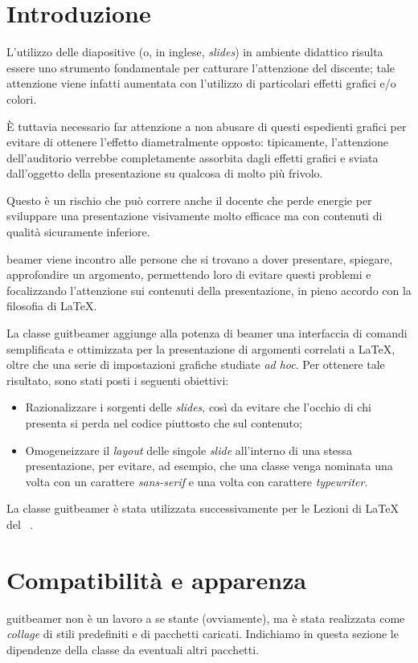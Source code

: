 \documentclass[a4paper,10pt]{article}
\newcommand{\lcap}{{\fontencoding{T1}\selectfont\guillemotleft}}
\newcommand{\rcap}{{\fontencoding{T1}\selectfont\guillemotright}}
\newcommand{\Cap}[1]{\lcap #1\rcap}
\newcommand{\pkg}[1]{\textsf{#1}}
\let\cls\pkg
\begin{document}
\section{Introduzione}
L'utilizzo delle diapositive (o, in inglese, \textit{slides}) in
ambiente didattico risulta essere uno strumento fondamentale per
catturare l'attenzione del discente; tale attenzione viene infatti
aumentata con l'utilizzo di particolari effetti grafici e/o colori.

\`E tuttavia necessario far attenzione a non abusare di questi
espedienti grafici per evitare di ottenere l'effetto diametralmente
opposto: tipicamente, l'attenzione dell'auditorio verrebbe
completamente assorbita dagli effetti grafici e sviata dall'oggetto
della presentazione su qualcosa di molto più frivolo.

Questo è un rischio che può correre anche il docente che \Cap{perde
energie} per sviluppare una presentazione visivamente molto efficace
ma con contenuti di qualità sicuramente inferiore.

\cls{beamer} viene incontro alle persone che si trovano a dover
presentare, spiegare, approfondire un argomento, permettendo loro di
evitare questi problemi e focalizzando l'attenzione sui contenuti
della presentazione, in pieno accordo con la filosofia di \LaTeX.

La classe \cls{guitbeamer} aggiunge alla potenza di \cls{beamer} una
interfaccia di comandi semplificata e ottimizzata per la presentazione
di argomenti correlati a \LaTeX, oltre che una serie di impostazioni
grafiche studiate \emph{ad hoc}. Per ottenere tale risultato, sono
stati posti i seguenti obiettivi: 
\begin{itemize}
  \item Razionalizzare i sorgenti delle \emph{slides}, così da evitare
    che l'occhio di chi presenta si perda nel codice piuttosto che sul
    contenuto;
  \item Omogeneizzare il \textit{layout} delle singole \emph{slide}
    all'interno di una stessa presentazione, per evitare, ad esempio,
    che una classe venga \Cap{nominata} una volta con un carattere
    \textit{sans-serif} e una volta con carattere \textit{typewriter}.
\end{itemize}

La classe \cls{guitbeamer} è stata utilizzata successivamente per le 
\Cap{Lezioni di \LaTeX} del \GuIT\ \cite{lez-latex05}.

\section{Compatibilità e apparenza}
\cls{guitbeamer} non è un lavoro a se stante (ovviamente), ma è stata
realizzata come \textit{collage} di stili predefiniti e di pacchetti
caricati. Indichiamo in questa sezione le dipendenze della classe da
eventuali altri pacchetti.
\end{document}
